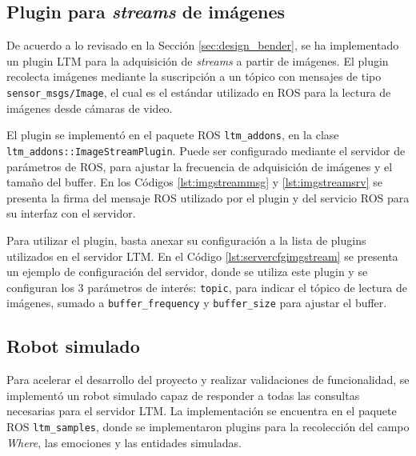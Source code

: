 \subsection{Plugin para \textit{streams} de imágenes}

De acuerdo a lo revisado en la Sección \ref{sec:design_bender}, se ha implementado un plugin LTM para la adquisición de \textit{streams} a partir de imágenes. El plugin recolecta imágenes mediante la suscripción a un tópico con mensajes de tipo \texttt{sensor\_msgs/Image}, el cual es el estándar utilizado en ROS para la lectura de imágenes desde cámaras de video.

El plugin se implementó en el paquete ROS \texttt{ltm\_addons}, en la clase \texttt{ltm\_addons::ImageStreamPlugin}. Puede ser configurado mediante el servidor de parámetros de ROS, para ajustar la frecuencia de adquisición de imágenes y el tamaño del buffer. En los Códigos \ref{lst:imgstreammsg} y \ref{lst:imgstreamsrv} se presenta la firma del mensaje ROS utilizado por el plugin y del servicio ROS para su interfaz con el servidor.
\lstset{style=/Style/ROS/MSG}



Para utilizar el plugin, basta anexar su configuración a la lista de plugins utilizados en el servidor LTM. En el Código \ref{lst:servercfgimgstream} se presenta un ejemplo de configuración del servidor, donde se utiliza este plugin y se configuran los 3 parámetros de interés: \texttt{topic}, para indicar el tópico de lectura de imágenes, sumado a \texttt{buffer\_frequency} y \texttt{buffer\_size} para ajustar el buffer.
\lstset{style=/Style/yaml/ROS}




\subsection{Robot simulado}

Para acelerar el desarrollo del proyecto y realizar validaciones de funcionalidad, se implementó un robot simulado capaz de responder a todas las consultas necesarias para el servidor LTM. La implementación se encuentra en el paquete ROS \texttt{ltm\_samples}, donde se implementaron plugins para la recolección del campo \textit{Where}, las emociones y las entidades simuladas.

